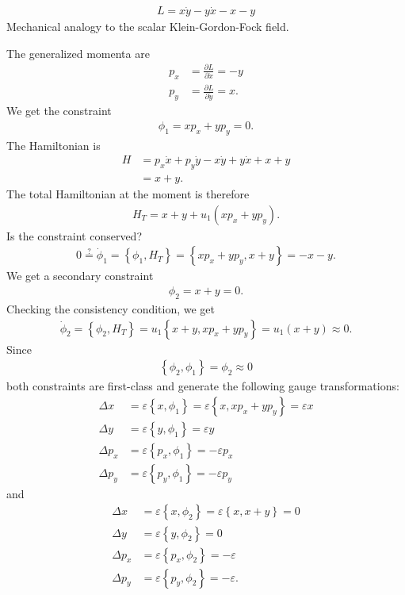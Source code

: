\begin{exercise}
\begin{align*}
L = x \dot{y} - y \dot{x} - x - y
\end{align*}
Mechanical analogy to the scalar Klein-Gordon-Fock field.
\end{exercise}
\begin{solution}
The generalized momenta are
\begin{align*}
p_x &= \frac{\partial L}{\partial \dot{x}} = -y \\
p_y &= \frac{\partial L}{\partial \dot{y}} = x.
\end{align*}
We get the constraint 
\begin{align*}
\phi_1 = x p_x + y p_y = 0.
\end{align*}
The Hamiltonian is
\begin{align*}
H &= p_x \dot{x} + p_y \dot{y} - x \dot{y} + y \dot{x} + x + y \\
&= x + y.
\end{align*}
The total Hamiltonian at the moment is therefore
\begin{align*}
H_T = x + y + u_1 (x p_x + y p_y).
\end{align*}
Is the constraint conserved?
\begin{align*}
0 \overset{?}{=} \dot{\phi}_1 = \left \{ \phi_1,H_T \right \} = \left \{ x p_x + y p_y,x + y \right \} = - x - y.
\end{align*}
We get a secondary constraint 
\begin{align*}
\phi_2 = x + y = 0.
\end{align*}
Checking the consistency condition, we get
\begin{align*}
\dot{\phi}_2 = \left \{ \phi_2,H_T \right \} = u_1 \left \{ x + y , x p_x + y p_y \right \} = u_1 (x + y) \approx 0.
\end{align*}
Since 
\begin{align*}
\left \{ \phi_2,\phi_1 \right \} = \phi_2 \approx 0
\end{align*}
both constraints are first-class and generate the following gauge transformations:
\begin{align*}
\Delta x &= \varepsilon \left \{ x,\phi_1 \right \} = \varepsilon \left \{ x,x p_x + y p_y \right \} = \varepsilon x \\
\Delta y &= \varepsilon \left \{ y,\phi_1 \right \} = \varepsilon y \\
\Delta p_x &= \varepsilon \left \{ p_x,\phi_1 \right \} = - \varepsilon p_x \\
\Delta p_y &= \varepsilon \left \{ p_y,\phi_1 \right \} = - \varepsilon p_y
\end{align*}
and
\begin{align*}
\Delta x &= \varepsilon \left \{ x,\phi_2 \right \} = \varepsilon \left \{ x,x + y \right \} = 0 \\
\Delta y &= \varepsilon \left \{ y,\phi_2 \right \} = 0 \\
\Delta p_x &= \varepsilon \left \{ p_x,\phi_2 \right \} = - \varepsilon \\
\Delta p_y &= \varepsilon \left \{ p_y,\phi_2 \right \} = - \varepsilon.
\end{align*}


\end{solution}
